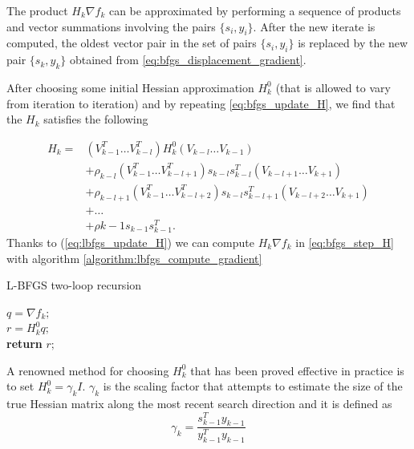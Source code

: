 \noindent The product $H_k \nabla f_k$ can be approximated by performing a sequence of products and vector summations involving the pairs $\{s_i, y_i\}$. After the new iterate is computed, the oldest vector pair in the set of pairs $\{s_i, y_i\}$ is replaced by the new pair $\{s_k , y_k\}$ obtained from \eqref{eq:bfgs_displacement_gradient}.
\vspace{3mm}

\noindent After choosing some initial Hessian approximation $H^{0}_{k}$ (that is allowed to vary from iteration to iteration) and by repeating \eqref{eq:bfgs_update_H}, we find that the $H_k$ satisfies the following

\begin{equation}
    \begin{aligned}
        H_k =& (V_{k-1}^{T} \dots V_{k-l}^{T}) H_{k}^{0}(V_{k-l} \dots V_{k-1}) \\
        &+ \rho_{k-l}(V_{k-1}^T \dots V_{k-l+1}^T) s_{k-l} s_{k-l}^T (V_{k-l+1} \dots V_{k+1}) \\
        &+ \rho_{k-l+1}(V_{k-1}^T \dots V_{k-l+2}^T) s_{k-l} s_{k-l+1}^T (V_{k-l+2} \dots V_{k+1}) \\
        &+ \dots \\
        &+ \rho{k-1}s_{k-1}s^{T}_{k-1}.
    \end{aligned}
    \label{eq:lbfgs_update_H}
\end{equation}
Thanks to (\ref{eq:lbfgs_update_H}) we can compute $H_k \nabla f_k$ in \eqref{eq:bfgs_step_H} with algorithm \ref{algorithm:lbfgs_compute_gradient}

\begin{algorithm}[H]
    \caption{L-BFGS two-loop recursion}
    \label{algorithm:lbfgs_compute_gradient}
    $q=\nabla f_k;$ \\
    $r=H_k^0q;$ \\
    \textbf{return} $r;$
\end{algorithm}

\noindent A renowned method for choosing $H_{k}^{0}$ that has been proved effective in practice is to set $H_{k}^{0} = \gamma_k I$. $\gamma_k$ is the scaling factor that attempts to estimate the size of the true Hessian matrix along the most recent search direction and it is defined as
\begin{equation}
    \gamma_k = \frac{s_{k-1}^T y_{k-1}}{y_{k-1}^T y_{k-1}}
    \label{eq:lbfgs_initial_H}
\end{equation}

